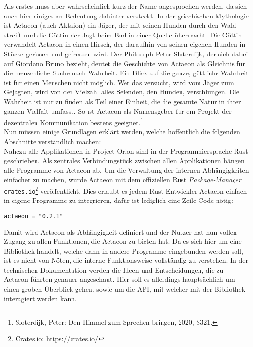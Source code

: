 \documentclass[a4paper,11pt,titlepage,twoside]{memoir}
\begin{document}
\noindent Als erstes muss aber wahrscheinlich kurz der Name
angesprochen werden, da sich auch hier einiges an Bedeutung dahinter
versteckt. In der griechischen Mythologie ist Actaeon (auch Aktaion)
ein Jäger, der mit seinen Hunden durch den Wald streift und die Göttin
der Jagt beim Bad in einer Quelle überrascht. Die Göttin verwandelt
Actaeon in einen Hirsch, der daraufhin von seinen eigenen Hunden in
Stücke gerissen und gefressen wird. Der Philosoph Peter Sloterdijk,
der sich dabei auf Giordano Bruno bezieht, deutet die Geschichte von
Actaeon als Gleichnis für die menschliche Suche nach Wahrheit. Ein
Blick auf die ganze, göttliche Wahrheit ist für einen Menschen nicht
möglich. Wer das versucht, wird vom Jäger zum Gejagten, wird von der
Vielzahl alles Seienden, den Hunden, verschlungen. Die Wahrheit ist
nur zu finden als Teil einer Einheit, die die gesamte Natur in ihrer
ganzen Vielfalt umfasst. So ist Actaeon als Namensgeber für ein
Projekt der dezentralen Kommunikation bestens geeignet.\footnote{Sloterdijk, Peter: Den Himmel zum Sprechen bringen, 2020, S321.}\\

\noindent Nun müssen einige Grundlagen erklärt werden, welche
hoffentlich die folgenden Abschnitte verständlich machen:\\
Nahezu alle Applikationen in Project Orion sind in der
Programmiersprache Rust geschrieben. Als zentrales Verbindungstück
zwischen allen Applikationen hängen alle Programme von Actaeon ab. Um
die Verwaltung der internen Abhängigkeiten einfacher zu machen, wurde
Actaeon mit dem offiziellen Rust \emph{Package-Manager} \texttt{crates.io}\footnote{Crates.io: \url{https://crates.io/}}
veröffentlicht. Dies erlaubt es jedem Rust Entwickler Actaeon einfach
in eigene Programme zu integrieren, dafür ist lediglich eine Zeile
Code nötig:
\begin{verbatim}
actaeon = "0.2.1"
\end{verbatim}
\noindent Damit wird Actaeon als Abhängigkeit definiert und der Nutzer
hat nun vollen Zugang zu allen Funktionen, die Actaeon zu bieten hat.
Da es sich hier um eine Bibliothek handelt, welche dann in andere
Programme eingebunden werden soll, ist es nicht von Nöten, die interne
Funktionsweise vollständig zu verstehen. In der technischen
Dokumentation werden die Ideen und Entscheidungen, die zu Actaeon
führten genauer angeschaut. Hier soll es allerdings hauptsächlich um
einen groben Überblick gehen, sowie um die API, mit welcher mit der
Bibliothek interagiert werden kann.\\
\end{document}
